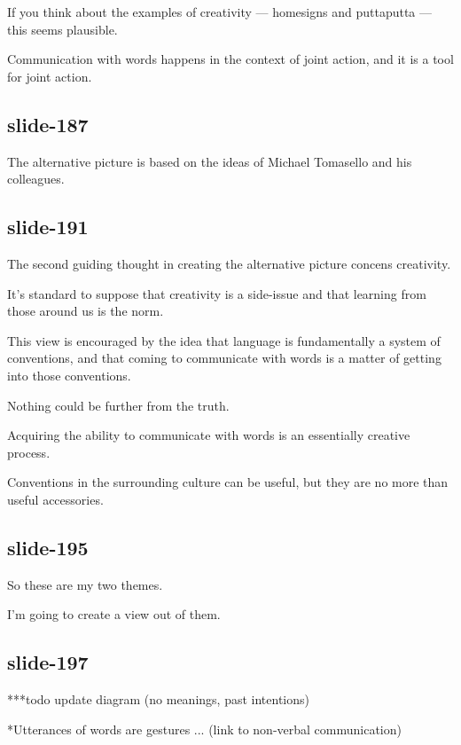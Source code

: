 \documentclass[12pt,\papersize]{extarticle}
\begin{document}
If you think about the examples of creativity --- homesigns and puttaputta --- this seems plausible.
 
Communication with words happens in the context of joint action, and it is a tool for joint action.
 
\subsection{slide-187}
The alternative picture is based on the ideas of Michael Tomasello and his colleagues.
 
\subsection{slide-191}
The second guiding thought in creating the alternative picture concens creativity.
 
It's standard to suppose that creativity is a side-issue and that learning from those around us is the norm.
 
This view is encouraged by the idea that language is fundamentally a system of conventions, and that coming to communicate with words is a matter of getting into those conventions.
 
Nothing could be further from the truth.
 
Acquiring the ability to communicate with words is an essentially creative process.
 
Conventions in the surrounding culture can be useful, but they are no more than useful accessories.
 
\subsection{slide-195}
So these are my two themes.
 
I'm going to create a view out of them.
 
\subsection{slide-197}
***todo update diagram (no meanings, past intentions)
 
*Utterances of words are gestures ... (link to non-verbal communication)
 
 






\end{document}
